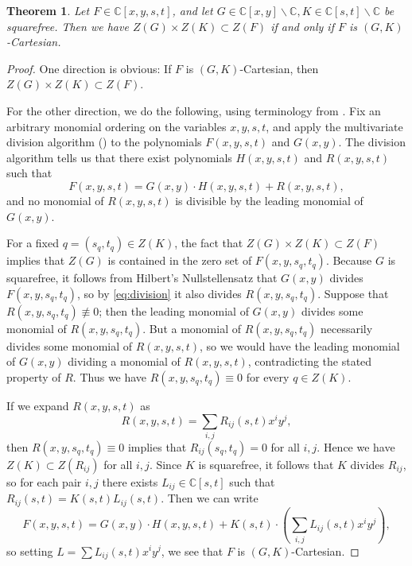 \documentclass{daj}
\newtheorem{theorem}{Theorem}[section]
\theoremstyle{definition}
\newcommand{\C}{\mathbb C}
\begin{document}
\begin{theorem}\label{thm:null1}
Let $F\in \C[x,y,s,t]$, and let $G\in \C[x,y]\backslash\C,K\in \C[s,t]\backslash\C$ be squarefree.
Then we have  $ Z(G)\times Z(K)\subset Z(F)$ if and only if $F$ is $(G,K)$-Cartesian.
\end{theorem}
\begin{proof}
One direction is obvious: If $F$ is $(G,K)$-Cartesian, then $Z(G)\times Z(K)\subset Z(F)$.

For the other direction, we do the following, using terminology from \cite[Chapter 2]{CLOS}.
Fix an arbitrary monomial ordering on the variables $x,y,s,t$, and apply the multivariate division algorithm (\cite[Theorem 2.3.3]{CLOS}) to the polynomials $F(x,y,s,t)$ and $G(x,y)$.
The division algorithm tells us that there exist polynomials $H(x,y,s,t)$ and $R(x,y,s,t)$ such that
\begin{equation}\label{eq:division}
F(x,y,s,t)=G(x,y)\cdot H(x,y,s,t) + R(x,y,s,t),
\end{equation}
and no monomial of $R(x,y,s,t)$ is divisible by the leading monomial of $G(x,y)$.


For a fixed $q =(s_q,t_q)\in Z(K)$, 
the fact that $Z(G)\times Z(K)\subset Z(F)$ implies that $Z(G)$ is contained in the zero set of $F(x,y,s_q,t_q)$.
Because $G$ is squarefree, it follows from Hilbert's Nullstellensatz that $G(x,y)$ divides $F(x,y,s_q,t_q)$, 
so by \eqref{eq:division} it also divides $R(x,y,s_q,t_q)$.
Suppose that $R(x,y,s_q,t_q)\not\equiv 0$; then the leading monomial of $G(x,y)$ divides some monomial of $R(x,y,s_q,t_q)$.
But a monomial of $R(x,y,s_q,t_q)$ necessarily divides some monomial of $R(x,y,s,t)$, so we would have the leading monomial of $G(x,y)$ dividing a monomial of $R(x,y,s,t)$, contradicting the stated property of $R$.
Thus we have $R(x,y,s_q,t_q)\equiv 0$ for every $q\in Z(K)$.


If we expand $R(x,y,s,t)$ as
\[R(x,y,s,t)=\sum_{i,j}R_{ij}(s,t) x^iy^j,\]
then $R(x,y,s_q,t_q)\equiv 0$ implies that $R_{ij}(s_q,t_q)=0$ for all $i,j$.
Hence we have $Z(K)\subset Z(R_{ij})$ for all $i,j$.
Since $K$ is squarefree, it follows that $K$ divides $R_{ij}$, so for each pair $i,j$ there exists $L_{ij}\in \C[s,t]$ such that  $R_{ij}(s,t) = K(s,t)L_{ij}(s,t)$.
Then  we can write
$$F(x,y,s,t)=G(x,y)\cdot H(x,y,s,t) + K(s,t) \cdot \left(\sum_{i,j}L_{ij}(s,t) x^iy^j\right),$$
so setting $L=\sum L_{ij}(s,t)x^iy^j$, we see that $F$ is $(G,K)$-Cartesian.
\end{proof}
\end{document}
